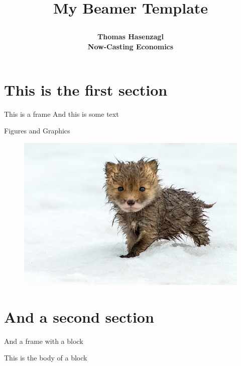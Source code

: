 \documentclass[xcolor=svgnames, 10pt, aspectratio=169]{beamer}
\title{\raggedright \color{myblue} \titlefont My Beamer Template}
\date{\raggedright\vfill \small A Cool Conference\\[4pt] May 17, 2018}
\author[shortname]{\raggedright \bf Thomas Hasenzagl \\[4pt] \normalfont \small Now-Casting Economics}
\begin{document}

\section{This is the first section} 


\begin{frame}{This is a frame}
    And this is some text
\end{frame}


\begin{frame}{Figures and Graphics}
    \begin{figure}
        \centering
        \includegraphics[scale=0.3]{fox}
    \end{figure}
\end{frame}


\section{And a second section}


\begin{frame}{And a frame with a block}

    \begin{tcolorbox}[title=This is the title of a block]
    This is the body of a block 
    \end{tcolorbox}

\end{frame}
\end{document}
